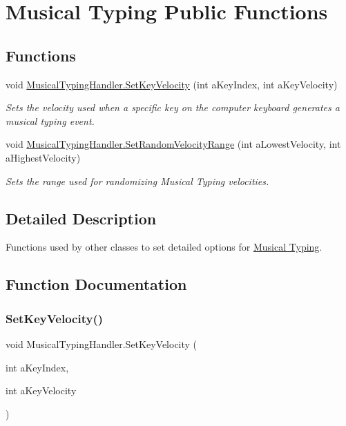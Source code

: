 \hypertarget{group___mus_typ_pub_func}{}\section{Musical Typing Public Functions}
\label{group___mus_typ_pub_func}
\subsection*{Functions}
\begin{DoxyCompactItemize}
\item 
void \hyperlink{group___mus_typ_pub_func_ga02f86b46bb63dc751b669035b7aa5ce0}{Musical\+Typing\+Handler.\+Set\+Key\+Velocity} (int a\+Key\+Index, int a\+Key\+Velocity)
\begin{DoxyCompactList}\small\item\em Sets the velocity used when a specific key on the computer keyboard generates a musical typing event. \end{DoxyCompactList}\item 
void \hyperlink{group___mus_typ_pub_func_gaf6ba35e3a081cff62fa963ed32d218c8}{Musical\+Typing\+Handler.\+Set\+Random\+Velocity\+Range} (int a\+Lowest\+Velocity, int a\+Highest\+Velocity)
\begin{DoxyCompactList}\small\item\em Sets the range used for randomizing Musical Typing velocities. \end{DoxyCompactList}\end{DoxyCompactItemize}


\subsection{Detailed Description}
Functions used by other classes to set detailed options for \hyperlink{group___mus_typ}{Musical Typing}. 

\subsection{Function Documentation}
\mbox{\label{group___mus_typ_pub_func_ga02f86b46bb63dc751b669035b7aa5ce0}} 
\subsubsection{\texorpdfstring{Set\+Key\+Velocity()}{SetKeyVelocity()}}
{\footnotesize\ttfamily void Musical\+Typing\+Handler.\+Set\+Key\+Velocity (\begin{DoxyParamCaption}\item[{int}]{a\+Key\+Index,  }\item[{int}]{a\+Key\+Velocity }\end{DoxyParamCaption})}




